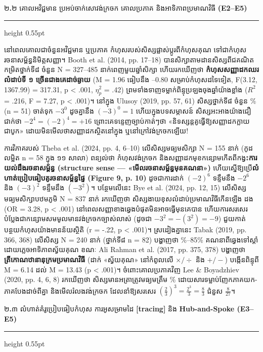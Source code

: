 \documentclass[a4paper,12pt]{article}
\newcommand{\en}[1]{{\TimesEn #1}}
\newcommand{\enbf}[1]{{\TimesEn\textbf{#1}}}
\newcommand{\subsectitle}[1]{{\muol\fontsize{11.5pt}{15.5pt}\selectfont #1}}
\newcommand{\subsec}[1]{%
  \Needspace{1.6cm}%
  \vspace{2pt}%
  \subsectitle{#1}\par%
  \vspace{-2pt}%
  {\color{black}\hrule height 0.55pt}%
  \vspace{2pt}%
}
\begin{document}
\subsec{២\enbf{.}២ គោលអវិជ្ជមាន ប្រអប់ចាក់សោវង់ក្រចក គោលប្រភាគ និងអាទិភាពប្រមាណវិធី \enbf{(E2--E5)}}

នៅពេលគោលជាចំនួនអវិជ្ជមាន ឬប្រភាគ កំហុសរបស់សិស្សផ្លាស់ប្ដូរពីកំហុសគុណ ទៅជាកំហុសរចនាសម្ព័ន្ធនិមិត្តសញ្ញា។ \en{Booth et al. (2014, pp. 17--18)} បានសិក្សាតាមដានសិស្សពីជគណិតកម្រិតថ្នាក់ទី៨ ចំនួន \en{N = 327--485} នាក់ពេញមួយឆ្នាំសិក្សា ហើយរកឃើញថា \textbf{កំហុសសញ្ញាដកឈរលំដាប់ទី ១ ច្រើនជាងគេដាច់ឆ្ងាយ} (\en{M = 1.96} ធៀបនឹង \en{0.21--0.80} សម្រាប់កំហុសដទៃទៀត, \en{F(3.12, 1367.99) = 317.31, p < .001, $\eta_p^2$ = .42}) ព្រមទាំងទាញទម្លាក់ពិន្ទុប្រឡងចុងឆ្នាំយ៉ាងខ្លាំង (\en{$R^2$ = .216, F = 7.27, p < .001})។ នៅក្នុង \en{Ulusoy (2019, pp. 57, 61)} សិស្សថ្នាក់ទី៨ ចំនួន \en{30.9\% (n = 51)} ចាត់ទុក $-3^0$ ដូចគ្នានឹង $(-3)^0 = 1$ ហើយក្នុងបទសម្ភាសន៍ សិស្សអះអាងយ៉ាងជឿជាក់ថា $-2^4 = (-2)^4 = +16$ ព្រោះគេទន្ទេញច្បាប់កាត់ៗថា «និទស្សន្តគូធ្វើឱ្យសញ្ញាដកក្លាយជាបូក» ដោយមិនមើលថាសញ្ញាដកស្ថិតនៅក្នុង ឬនៅក្រៅវង់ក្រចកឡើយ!

ការវិភាគរបស់ \en{Theba et al. (2024, pp. 4, 6--10)} លើសិស្សមធ្យមសិក្សា \en{N = 155} នាក់ (កូដលម្អិត \en{n = 58} ក្នុង ១១ សាលា) ពន្យល់ថា កំហុសវង់ក្រចក និងសញ្ញាដកមុខកន្សោមកើតពីកង្វះ\textbf{ការយល់ដឹងរចនាសម្ព័ន្ធ (\en{structure sense} — «មើលរចនាសម្ព័ន្ធមុនគណនា»)} ហើយស្នើឱ្យប្រើ\textbf{លំហាត់ប្រៀបធៀបគូរចនាសម្ព័ន្ធផ្ទៃ (\en{Figure 9, p. 10})} ដូចជាការដាក់ $(-2)^6$ ទន្ទឹមនឹង $-2^6$ និង $(-3)^2$ ទន្ទឹមនឹង $(-3^2)$។ បន្ថែមលើនេះ \en{Bye et al. (2024, pp. 12, 15)} លើសិស្សមធ្យមសិក្សាបឋមភូមិ \en{N = 837} នាក់ រកឃើញថា សិស្សងាយខុសលំដាប់ប្រមាណវិធីកើនឡើង \en{3.28} ដង (\en{OR = 3.28, p < .001}) នៅពេលសញ្ញាខាងឆ្វេងបំផុតមិនអាចធ្វើមុនគេបាន ហើយការសរសេរបំប្លែងជាកន្សោមសមមូលមានវង់ក្រចកច្បាស់លាស់ (ដូចជា $-3^2 = -(3^2) = -9$) ជួយកាត់បន្ថយកំហុសយ៉ាងមានន័យស្ថិតិ (\en{r = -.22, p < .001})។ ស្រដៀងគ្នានេះ \en{Tabak (2019, pp. 366, 368)} លើសិស្ស \en{N = 240} នាក់ (ថ្នាក់ទី៨ \en{n = 82}) បង្ហាញថា \en{76\%--85\%} គណនាពីឆ្វេងទៅស្ដាំដោយភ្លេចអាទិភាពស្វ័យគុណ ខណៈ \en{Ali Rahman et al. (2017, pp. 375, 378)} បង្ហាញថា \textbf{ត្រីកោណឋានានុក្រមប្រមាណវិធី} (ដាក់ «ស្វ័យគុណ» នៅកំពូលលើ $\times/\div$ និង $+/-$) បង្កើនពិន្ទុពី \en{M = 6.14} ដល់ \en{M = 13.43 (p < .001)}។ ចំពោះគោលប្រភាគវិញ \en{Lee \& Boyadzhiev (2020, pp. 4, 6, 8)} រកឃើញថា សិស្សមានអត្រាត្រូវមធ្យមត្រឹម \en{47\%} ដោយសារទម្លាប់ញែកភាគយក-ភាគបែងដាច់ពីគ្នា និងមើលរំលងវង់ក្រចក ដែលនាំឱ្យសរសេរ $(\frac{2}{3})^3 = \frac{2^3}{3} = \frac{8}{3}$ ជំនួស $\frac{8}{27}$។

\subsec{២\enbf{.}៣ លំហាត់គំរូប្រៀបធៀបកំហុស ការអូសម្រាមដៃ \enbf{[tracing]} និង \enbf{Hub-and-Spoke (E3--E5)}}
\end{document}
